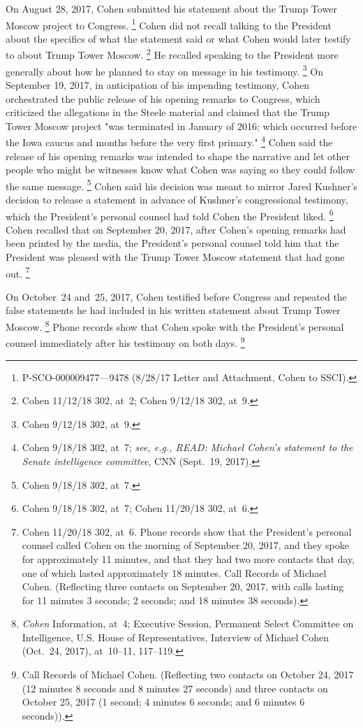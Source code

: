 {On August 28, 2017, Cohen submitted his statement about the Trump Tower Moscow project to Congress.%
\footnote{P-SCO-000009477---9478 (8/28/17 Letter and Attachment, Cohen to SSCI).}
Cohen did not recall talking to the President about the specifics of what the statement said or what Cohen would later testify to about Trump Tower Moscow.%
\footnote{Cohen 11/12/18 302, at~2;
Cohen 9/12/18 302, at~9.}
He recalled speaking to the President more generally about how he planned to stay on message in his testimony.%
\footnote{Cohen 9/12/18 302, at~9.}
On September 19, 2017, in anticipation of his impending testimony, Cohen orchestrated the public release of his opening remarks to Congress, which criticized the allegations in the Steele material and claimed that the Trump Tower Moscow project "was terminated in January of 2016; which occurred before the Iowa caucus and months before the very first primary."%
\footnote{Cohen 9/18/18 302, at~7;
\textit{see, e.g., READ: Michael Cohen's statement to the Senate intelligence committee}, CNN (Sept.~19, 2017).}
Cohen said the release of his opening remarks was intended to shape the narrative and let other people who might be witnesses know what Cohen was saying so they could follow the same message.%
\footnote{Cohen 9/18/18 302, at~7.}
Cohen said his decision was meant to mirror Jared Kushner's decision to release a statement in advance of Kushner's congressional testimony, which the President's personal counsel had told Cohen the President liked.%
\footnote{Cohen 9/18/18 302, at~7;
Cohen 11/20/18 302, at~6.}
Cohen recalled that on September 20, 2017, after Cohen's opening remarks had been printed by the media, the President's personal counsel told him that the President was pleased with the Trump Tower Moscow statement that had gone out.%
\footnote{Cohen 11/20/18 302, at~6.
Phone records show that the President's personal counsel called Cohen on the morning of September 20, 2017, and they spoke for approximately 11 minutes, and that they had two more contacts that day, one of which lasted approximately 18 minutes.
Call Records of Michael Cohen. (Reflecting three contacts on September 20, 2017, with calls lasting for 11 minutes 3 seconds; 2 seconds; and 18 minutes 38 seconds).}

On October~24 and~25, 2017, Cohen testified before Congress and repeated the false statements he had included in his written statement about Trump Tower Moscow.%
\footnote{\textit{Cohen} Information, at~4;
Executive Session, Permanent Select Committee on Intelligence, U.S. House of Representatives, Interview of Michael Cohen (Oct.~24, 2017), at~10--11, 117--119.}
Phone records show that Cohen spoke with the President's personal counsel immediately after his testimony on both days.%
\footnote{Call Records of Michael Cohen.
(Reflecting two contacts on October 24, 2017 (12 minutes 8 seconds and 8 minutes 27 seconds) and three contacts on October 25, 2017 (1 second; 4 minutes 6 seconds; and 6 minutes 6 seconds)).}

}

